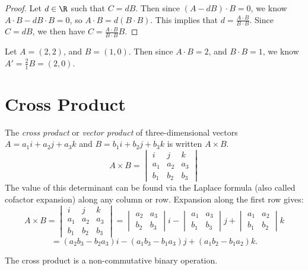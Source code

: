 \documentclass[12pt]{article}
\begin{document}
\begin{proof}
    Let $d \in \R$ such that $C = dB$. Then since $(A - dB) \cdot B = 0$, we know $A \cdot B - dB \cdot B = 0$, so $A \cdot B = d(B \cdot B)$. This implies that $d = \frac{A \cdot B}{B \cdot B}$. Since $C = dB$, we then have $C = \frac{A \cdot B}{B \cdot B}B$.
\end{proof}

\begin{exmp}
   Let $A = \left(2, 2\right)$, and $B = \left(1, 0\right)$. Then since $A \cdot B = 2$, and $B \cdot B = 1$, we know $A' = \frac{2}{1}B = \left(2, 0\right)$.
\end{exmp}

\section{Cross Product}

\begin{defn}
    The \emph{cross product} or \emph{vector product} of three-dimensional vectors $A = a_1i + a_2j + a_3k$ and $B = b_1i + b_2j + b_3k$ is written $A \times B$. \[A \times B = \begin{vmatrix}
        i & j & k \\ a_1 & a_2 & a_3 \\ b_1 & b_2 & b_3
    \end{vmatrix}\] The value of this determinant can be found via the Laplace formula (also called cofactor expansion) along any column or row. Expansion along the first row gives: \[A \times B =
    \begin{vmatrix}
        i & j & k \\ a_1 & a_2 & a_3 \\ b_1 & b_2 & b_3
    \end{vmatrix} =
    \begin{vmatrix}
        a_2 & a_3 \\ b_2 & b_3
    \end{vmatrix}i -
    \begin{vmatrix}
        a_1 & a_3 \\ b_1 & b_3
    \end{vmatrix}j +
    \begin{vmatrix}
        a_1 & a_2 \\ b_1 & b_2
    \end{vmatrix}k\] \[= (a_2b_3 - b_2a_3)i - (a_1b_3 - b_1a_3)j + (a_1b_2 - b_1a_2)k.\]
\end{defn}

\begin{rmk}
    The cross product is a non-commutative binary operation.
\end{rmk}
\end{document}
